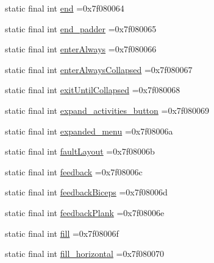 \begin{DoxyCompactItemize}
\item 
static final int \mbox{\hyperlink{classcom_1_1example_1_1trainawearapplication_1_1_r_1_1id_ab29d061aa1220df65ffdaee55a2a8b92}{end}} =0x7f080064
\item 
static final int \mbox{\hyperlink{classcom_1_1example_1_1trainawearapplication_1_1_r_1_1id_a89bf5594a372c63a5df06eac2c019fab}{end\+\_\+padder}} =0x7f080065
\item 
static final int \mbox{\hyperlink{classcom_1_1example_1_1trainawearapplication_1_1_r_1_1id_a413067003fb1f5dbedf33f521adb448b}{enter\+Always}} =0x7f080066
\item 
static final int \mbox{\hyperlink{classcom_1_1example_1_1trainawearapplication_1_1_r_1_1id_a897ccaa77b238fb23ff35bef2a1cc519}{enter\+Always\+Collapsed}} =0x7f080067
\item 
static final int \mbox{\hyperlink{classcom_1_1example_1_1trainawearapplication_1_1_r_1_1id_a9179f11942bb2b12088e5f645894296d}{exit\+Until\+Collapsed}} =0x7f080068
\item 
static final int \mbox{\hyperlink{classcom_1_1example_1_1trainawearapplication_1_1_r_1_1id_a3d6af4d86951c2ad91dbffea53d193c2}{expand\+\_\+activities\+\_\+button}} =0x7f080069
\item 
static final int \mbox{\hyperlink{classcom_1_1example_1_1trainawearapplication_1_1_r_1_1id_a0a22a8b2d2c6cb64c8648bb14ccf0687}{expanded\+\_\+menu}} =0x7f08006a
\item 
static final int \mbox{\hyperlink{classcom_1_1example_1_1trainawearapplication_1_1_r_1_1id_a61948a296df8c55f8744c7b159865f8c}{fault\+Layout}} =0x7f08006b
\item 
static final int \mbox{\hyperlink{classcom_1_1example_1_1trainawearapplication_1_1_r_1_1id_a49a1ec14ba404200858ae65cd943dc51}{feedback}} =0x7f08006c
\item 
static final int \mbox{\hyperlink{classcom_1_1example_1_1trainawearapplication_1_1_r_1_1id_a21482ba55a776d6d7ff586d43b728cf4}{feedback\+Biceps}} =0x7f08006d
\item 
static final int \mbox{\hyperlink{classcom_1_1example_1_1trainawearapplication_1_1_r_1_1id_a4a49531b46a14e2ebfa83ef2568b4da0}{feedback\+Plank}} =0x7f08006e
\item 
static final int \mbox{\hyperlink{classcom_1_1example_1_1trainawearapplication_1_1_r_1_1id_ac53bd4cb9a5ea00b0086475e80f266bd}{fill}} =0x7f08006f
\item 
static final int \mbox{\hyperlink{classcom_1_1example_1_1trainawearapplication_1_1_r_1_1id_a79456d22e5855d973008d0e5ceecf305}{fill\+\_\+horizontal}} =0x7f080070

\end{DoxyCompactItemize}

